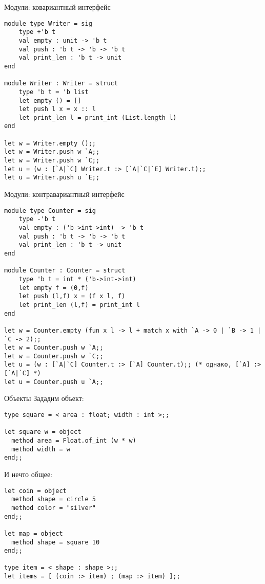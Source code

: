 \documentclass[aspectratio=169,dvipsnames,usenames]{beamer}
\begin{document}
\begin{frame}[fragile]{Модули: ковариантный интерфейс}
\footnotesize
\begin{verbatim}
module type Writer = sig
    type +'b t
    val empty : unit -> 'b t
    val push : 'b t -> 'b -> 'b t
    val print_len : 'b t -> unit
end

module Writer : Writer = struct
    type 'b t = 'b list
    let empty () = []
    let push l x = x :: l
    let print_len l = print_int (List.length l)
end

let w = Writer.empty ();;
let w = Writer.push w `A;;
let w = Writer.push w `C;;
let u = (w : [`A|`C] Writer.t :> [`A|`C|`E] Writer.t);;
let u = Writer.push u `E;;
\end{verbatim}
\end{frame}

\begin{frame}[fragile]{Модули: контравариантный интерфейс}
\footnotesize
\begin{verbatim}
module type Counter = sig
    type -'b t
    val empty : ('b->int->int) -> 'b t
    val push : 'b t -> 'b -> 'b t
    val print_len : 'b t -> unit
end

module Counter : Counter = struct
    type 'b t = int * ('b->int->int)
    let empty f = (0,f)
    let push (l,f) x = (f x l, f)
    let print_len (l,f) = print_int l
end

let w = Counter.empty (fun x l -> l + match x with `A -> 0 | `B -> 1 | `C -> 2);;
let w = Counter.push w `A;;
let w = Counter.push w `C;;
let u = (w : [`A|`C] Counter.t :> [`A] Counter.t);; (* однако, [`A] :> [`A|`C] *)
let u = Counter.push u `A;;
\end{verbatim}
\end{frame}

\begin{frame}[fragile]{Объекты}
Зададим объект:

\footnotesize
\begin{verbatim}
type square = < area : float; width : int >;;

let square w = object
  method area = Float.of_int (w * w)
  method width = w
end;;
\end{verbatim}

\normalsize
И нечто общее:

\footnotesize
\begin{verbatim}
let coin = object
  method shape = circle 5
  method color = "silver"
end;;

let map = object
  method shape = square 10
end;;

type item = < shape : shape >;;
let items = [ (coin :> item) ; (map :> item) ];;
\end{verbatim}
\end{frame}
\end{document}

